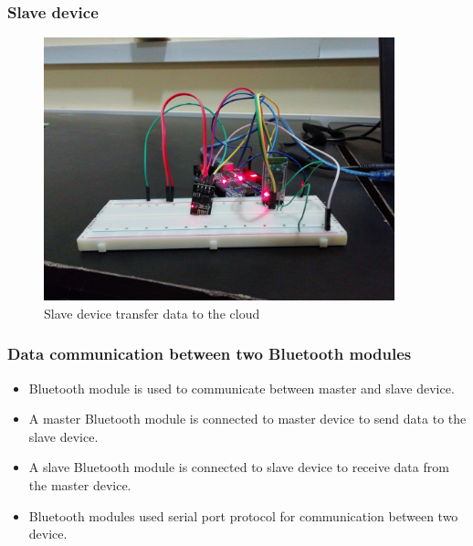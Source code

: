 \documentclass{beamer}
\begin{document}
\begin{frame}\frametitle{Slave device}
  \begin{figure}
  \centerline{\includegraphics[width=4.0in]{sl.jpg}}
  \caption{ \textbf{}Slave device transfer data to the cloud}
  \end{figure}
\end{frame}
\begin{frame}\frametitle{Data communication between two Bluetooth modules }
\begin{itemize}
\item Bluetooth module is used to communicate between master and slave device.
\item A master Bluetooth module is connected to master device to send data to the slave device. 
\item A slave Bluetooth module is connected to slave device to receive data from the master device.
\item Bluetooth modules used serial port protocol for communication between two device.
\end{itemize}
\end{frame}
\end{document}
